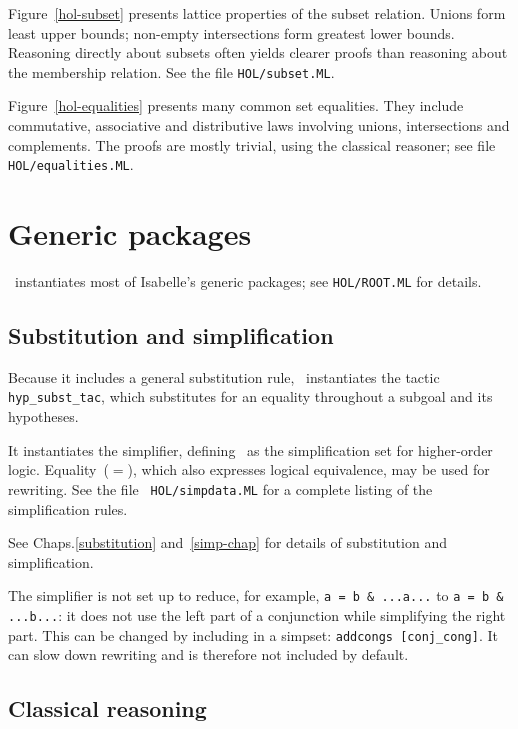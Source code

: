 Figure~\ref{hol-subset} presents lattice properties of the subset relation.
Unions form least upper bounds; non-empty intersections form greatest lower
bounds.  Reasoning directly about subsets often yields clearer proofs than
reasoning about the membership relation.  See the file {\tt HOL/subset.ML}.

Figure~\ref{hol-equalities} presents many common set equalities.  They
include commutative, associative and distributive laws involving unions,
intersections and complements.  The proofs are mostly trivial, using the
classical reasoner; see file {\tt HOL/equalities.ML}.


\section{Generic packages}
\HOL\ instantiates most of Isabelle's generic packages;
see {\tt HOL/ROOT.ML} for details.

\subsection{Substitution and simplification}

Because it includes a general substitution rule, \HOL\ instantiates the
tactic {\tt hyp_subst_tac}, which substitutes for an equality throughout a
subgoal and its hypotheses.

It instantiates the simplifier, defining~ as the
simplification set for higher-order logic.  Equality~($=$), which also
expresses logical equivalence, may be used for rewriting.  See the file {\tt
HOL/simpdata.ML} for a complete listing of the simplification rules.

See %
{Chaps.\ts\ref{substitution} and~\ref{simp-chap}} for details of substitution
and simplification.

\begin{warn}
  The simplifier is not set up to reduce, for example, \verb$a = b & ...a...$
  to \verb$a = b & ...b...$: it does not use the left part of a conjunction
  while simplifying the right part. This can be changed by including
   in a simpset: \verb$addcongs [conj_cong]$. It can slow
  down rewriting and is therefore not included by default.
\end{warn}

\subsection{Classical reasoning}

